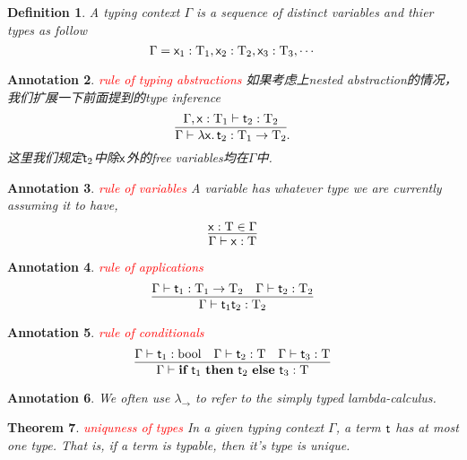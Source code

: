 \documentclass{article}
\theoremstyle{plain}
\newtheorem{theorem}{Theorem}
\newtheorem{definition}[theorem]{Definition}
\newtheorem{annotation}[theorem]{Annotation}
\theoremstyle{nonumberplain}
\newcommand{\lam}[2]{\ensuremath{\lambda #1\ldotp #2}} %
\newcommand{\singletype}[1]{\text{#1}}
\newcommand{\termtype}[2]{\ensuremath{#1:#2}}
\newcommand{\term}[1]{\ensuremath\mathsf{#1}}
\newcommand{\ifelse}[3]{\ensuremath{\textbf{if}~#1~\textbf{then}~#2~\textbf{else}~#3}}
\newcommand{\redt}[1]{\textcolor{red}{#1}}
\begin{document}
\begin{definition}
\rm A typing context $\Gamma$ is a sequence of distinct variables and thier types as follow
$$
\Gamma = \termtype{\term{x}_1}{\singletype{T}_1},\termtype{\term{x}_2}{\singletype{T}_2},\termtype{\term{x}_3}{\singletype{T}_3},\cdots
$$
\end{definition}

\begin{annotation}
\rm \redt{rule of typing abstractions} 如果考虑上nested abstraction的情况，我们扩展一下前面提到的type inference
$$
\infer{\Gamma \vdash \termtype{\lam{\term{x}}{\term{t}_2}}{\singletype{T}_1 \to \singletype{T}_2}}{\termtype{\Gamma,\term{x}}{\singletype{T}_1} \vdash \termtype{\term{t}_2}{\singletype{T}_2}}.
$$
这里我们规定$\term{t}_2$中除$\term{x}$外的free variables均在$\Gamma$中.
\end{annotation}

\begin{annotation}
\rm \redt{rule of variables} A variable has whatever type we are currently assuming it to have,
$$
\infer{\Gamma \vdash \termtype{\term{x}}{\singletype{T}}}{\termtype{\term{x}}{\singletype{T}} \in \Gamma}
$$
\end{annotation}


\begin{annotation}
\rm \redt{rule of applications}
$$
\infer{\Gamma \vdash \termtype{\term{t}_1 \term{t}_2}{\singletype{T}_2}}{\Gamma	\vdash \termtype{\term{t}_1}{\singletype{T}_1 \to \singletype{T}_2 } & \Gamma \vdash \termtype{\term{t}_2}{\singletype{T}_2} }
$$
\end{annotation}

\begin{annotation}
\rm \redt{rule of conditionals}  
$$
\infer{\Gamma \vdash \termtype{\ifelse{\term{t}_1}{\term{t}_2}{\term{t}_3}}{\singletype{T}}}{\Gamma \vdash \termtype{\term{t}_1}{\singletype{bool}} & \Gamma \vdash \termtype{\term{t}_2}{\singletype{T}} & \Gamma \vdash \termtype{\term{t}_3}{\singletype{T}}}
$$
\end{annotation}


\begin{annotation}
\rm We often use $\lambda_{\to}$ to refer to the simply typed lambda-calculus. 
\end{annotation}

\begin{theorem}
\rm \redt{uniquness of types} In a given typing context $\Gamma$, a term $\term{t}$ has at most one type. That is, if a term is typable, then it's type is unique. 
\end{theorem}
\end{document}
